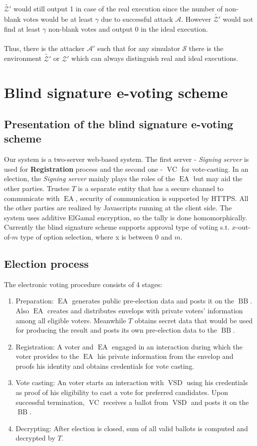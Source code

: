 \documentclass[12pt]{article}
\DeclareMathOperator{\vsd}{VSD}
\DeclareMathOperator{\ea}{EA}
\DeclareMathOperator{\bb}{BB}
\DeclareMathOperator{\voc}{VC}
\begin{document}
$\tilde{\mathcal{Z'}}$ would still output 1 in case of the real execution since the number of non-blank votes would be at least $\gamma$ due to successful attack  $\mathcal{A}$. However  $\tilde{\mathcal{Z'}}$ would not find at least $\gamma$ non-blank votes and output 0 in the ideal execution. \\\\
Thus, there is the attacker $\mathcal{A'}$ such that for any simulator $\mathcal{S}$ there is the environment $\tilde{\mathcal{Z'}}$ or $\mathcal{Z'}$ which can always distinguish real and ideal executions. 
%
%
\section {Blind signature e-voting scheme}
\subsection{Presentation of the blind signature e-voting scheme}
Our system is a two-server web-based system. The first server - \textit{Signing server}  is used for \textbf{Registration} process and the second one  - \textit{$\voc$} for vote-casting.  In an election, the \textit{Signing server} mainly plays the roles of the $\ea$ but may aid the other parties.  Trustee $T$ is a separate entity that has a secure channel to communicate with $\ea$, security of communication is supported by HTTPS. All the other parties are realized by Javascripts running at the client side. The system uses additive ElGamal encryption, so the tally is done homomorphically. Currently the blind signature  scheme supports approval type of voting s.t. $x$-out-of-$m$ type of option selection, where x is between 0 and $m$.
\subsection{Election process}
The electronic voting procedure consists of 4 stages:
\begin{enumerate}
\item Preparation: $\ea$ generates public pre-election data and posts it on the $\bb$. Also $\ea$ creates and distributes envelops with private voters' information among all eligible voters. Meanwhile $T$ obtains secret data that would be used for producing the result and posts its own pre-election data to the $\bb$. 
\item Registration: A voter and $\ea$ engaged in an interaction during which the voter provides to the $\ea$  his private information from the envelop and proofs his identity and obtains credentials for vote casting. 
\item Vote casting: An voter starts an interaction with $\vsd$ using his credentials as proof of his eligibility to cast a vote for preferred candidates. Upon successful termination, $\voc$ receives a ballot from $\vsd$ and posts it on the $\bb$. 
\item Decrypting: After election is closed, sum of all valid ballots is computed and decrypted by $T$. 
\end{enumerate}
\end{document}
